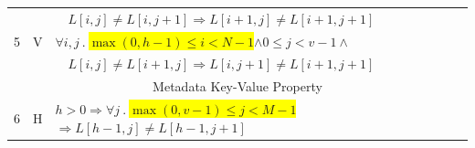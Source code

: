 \begin{table}[t]
\begin{tabular}{|c|c|l|}
         & & $\quad L[i,j] \neq L[i,j+1] \Rightarrow L[i+1,j] \neq L[i+1,j+1]$\\
         5 & V & $\forall i, j\ .\ $\colorbox{yellow}{$\max(0, h-1) \leq i < N-1$}$ \wedge 0 \leq j < v-1 \wedge $\\
         & & $\quad L[i,j] \neq L[i+1,j] \Rightarrow L[i,j+1] \neq L[i+1,j+1]$\\
        \hline
        \multicolumn{3}{|c|}{Metadata Key-Value Property}\\
        \hline
         6 & H & $h > 0 \Rightarrow \forall j\ .\ $\colorbox{yellow}{$\max(0, v-1) \leq j < M-1$}$ \Rightarrow L[h-1,j] \neq L[h-1,j+1]$\\
        \hline
    \end{tabular}
    \label{tab:parse_constraints}
\end{table}
